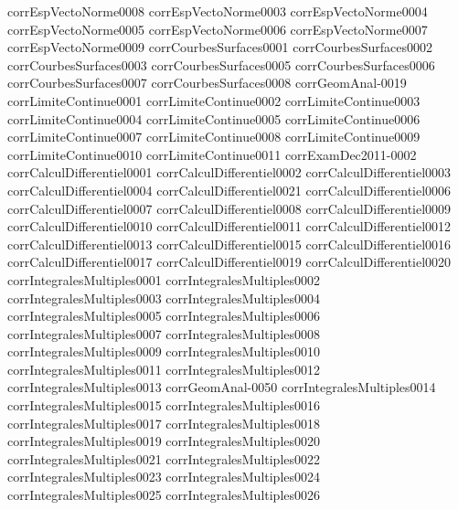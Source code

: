 {corrEspVectoNorme0008}
{corrEspVectoNorme0003}
{corrEspVectoNorme0004}
{corrEspVectoNorme0005}
{corrEspVectoNorme0006}
{corrEspVectoNorme0007}
{corrEspVectoNorme0009}
{corrCourbesSurfaces0001}
{corrCourbesSurfaces0002}
{corrCourbesSurfaces0003}
{corrCourbesSurfaces0005}
{corrCourbesSurfaces0006}
{corrCourbesSurfaces0007}
{corrCourbesSurfaces0008}
{corrGeomAnal-0019}
{corrLimiteContinue0001}
{corrLimiteContinue0002}
{corrLimiteContinue0003}
{corrLimiteContinue0004}
{corrLimiteContinue0005}
{corrLimiteContinue0006}
{corrLimiteContinue0007}
{corrLimiteContinue0008}
{corrLimiteContinue0009}
{corrLimiteContinue0010}
{corrLimiteContinue0011}
{corrExamDec2011-0002}
{corrCalculDifferentiel0001}
{corrCalculDifferentiel0002}
{corrCalculDifferentiel0003}
{corrCalculDifferentiel0004}
{corrCalculDifferentiel0021}
{corrCalculDifferentiel0006}
{corrCalculDifferentiel0007}
{corrCalculDifferentiel0008}
{corrCalculDifferentiel0009}
{corrCalculDifferentiel0010}
{corrCalculDifferentiel0011}
{corrCalculDifferentiel0012}
{corrCalculDifferentiel0013}
{corrCalculDifferentiel0015}
{corrCalculDifferentiel0016}
{corrCalculDifferentiel0017}
{corrCalculDifferentiel0019}
{corrCalculDifferentiel0020}
{corrIntegralesMultiples0001}
{corrIntegralesMultiples0002}
{corrIntegralesMultiples0003}
{corrIntegralesMultiples0004}
{corrIntegralesMultiples0005}
{corrIntegralesMultiples0006}
{corrIntegralesMultiples0007}
{corrIntegralesMultiples0008}
{corrIntegralesMultiples0009}
{corrIntegralesMultiples0010}
{corrIntegralesMultiples0011}
{corrIntegralesMultiples0012}
{corrIntegralesMultiples0013}
{corrGeomAnal-0050}
{corrIntegralesMultiples0014}
{corrIntegralesMultiples0015}
{corrIntegralesMultiples0016}
{corrIntegralesMultiples0017}
{corrIntegralesMultiples0018}
{corrIntegralesMultiples0019}
{corrIntegralesMultiples0020}
{corrIntegralesMultiples0021}
{corrIntegralesMultiples0022}
{corrIntegralesMultiples0023}
{corrIntegralesMultiples0024}
{corrIntegralesMultiples0025}
{corrIntegralesMultiples0026}
